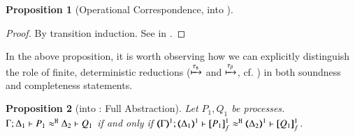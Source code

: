 \documentclass[preprint,11pt]{elsarticle}
\newtheorem{proposition}{Proposition}[section]
\begin{document}
{%
%
%		    


\begin{proposition}[Operational Correspondence, \HOp into \HO]\rm
	\label{prop:op_corr_HOp_to_HO}

\end{proposition}


\begin{proof}
By transition induction. See  in .
\end{proof}

In the above proposition, it is worth
observing how we can explicitly distinguish the role of finite, deterministic reductions 
($\xmapsto{\tau_{\mathsf{s}}}$ and $\xmapsto{\tau_{\beta}}$, cf. ) in both soundness and completeness statements.

\begin{proposition}[\HOp into \HO: Full Abstraction]%
	\label{prop:fulla_HOp_to_HO}
	Let $P_1, Q_1$ be \HOp processes. \\
	$\Gamma; \Delta_1 \vdash P_1 \approx^\mathtt{H} \Delta_2 \vdash Q_1$
	if and only if
	$\horel{\tmap{\Gamma}{1}}{\tmap{\Delta_1}{1}}{\pmapp{P_1}{1}{f}}{\hwb}{\tmap{\Delta_2}{1}}{\pmapp{Q_1}{1}{f}}$.
\end{proposition}

}
\end{document}
